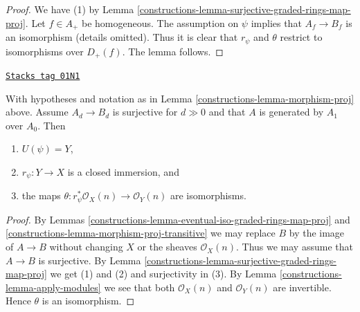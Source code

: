 \begin{proof}

We have (1) by Lemma \ref{constructions-lemma-surjective-graded-rings-map-proj}.
Let $f \in A_{+}$ be homogeneous. The assumption on $\psi$ implies that
$A_f \to B_f$ is an isomorphism (details omitted). Thus it is clear that
$r_\psi$ and $\theta$ restrict to isomorphisms over $D_{+}(f)$.
The lemma follows.
\end{proof}

\begin{lemma}
\label{constructions-lemma-surjective-graded-rings-generated-degree-1-map-proj}
\href{https://stacks.math.columbia.edu/tag/01N1}{\texttt{Stacks tag 01N1}}

With hypotheses and notation as in Lemma \ref{constructions-lemma-morphism-proj} above.
Assume $A_d \to B_d$ is surjective for $d \gg 0$ and that $A$ is generated
by $A_1$ over $A_0$. Then
\begin{enumerate}
\item $U(\psi) = Y$,
\item $r_\psi : Y \to X$ is a closed immersion, and
\item the maps $\theta : r_\psi^*\mathcal{O}_X(n) \to \mathcal{O}_Y(n)$
are isomorphisms.
\end{enumerate}
\end{lemma}

\begin{proof}

By Lemmas \ref{constructions-lemma-eventual-iso-graded-rings-map-proj} and
\ref{constructions-lemma-morphism-proj-transitive}
we may replace $B$ by the image of $A \to B$
without changing $X$ or the sheaves $\mathcal{O}_X(n)$.
Thus we may assume that $A \to B$ is surjective. By
Lemma \ref{constructions-lemma-surjective-graded-rings-map-proj} we get (1) and (2)
and surjectivity in (3).
By Lemma \ref{constructions-lemma-apply-modules} we see that both
$\mathcal{O}_X(n)$ and $\mathcal{O}_Y(n)$
are invertible. Hence $\theta$ is an isomorphism.
\end{proof}


